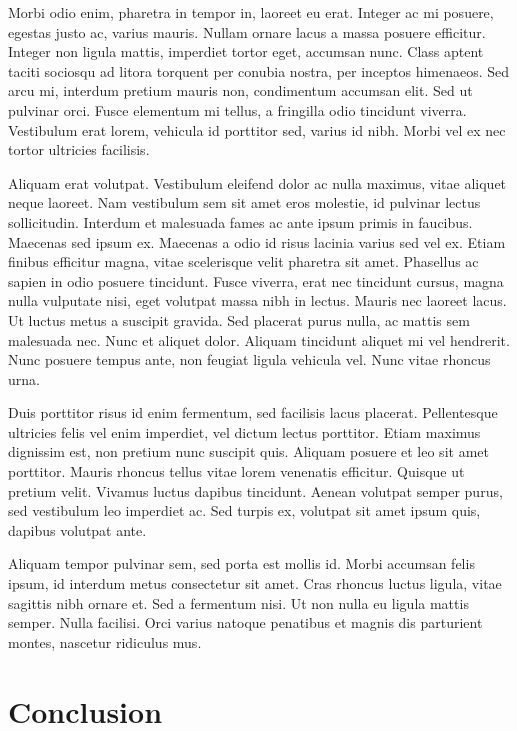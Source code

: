 \documentclass[twocolumn]{article}
\begin{document}
	Morbi odio enim, pharetra in tempor in, laoreet eu erat. Integer ac mi posuere, egestas justo ac, varius mauris. Nullam ornare lacus a massa posuere efficitur. Integer non ligula mattis, imperdiet tortor eget, accumsan nunc. Class aptent taciti sociosqu ad litora torquent per conubia nostra, per inceptos himenaeos. Sed arcu mi, interdum pretium mauris non, condimentum accumsan elit. Sed ut pulvinar orci. Fusce elementum mi tellus, a fringilla odio tincidunt viverra. Vestibulum erat lorem, vehicula id porttitor sed, varius id nibh. Morbi vel ex nec tortor ultricies facilisis.
	
	Aliquam erat volutpat. Vestibulum eleifend dolor ac nulla maximus, vitae aliquet neque laoreet. Nam vestibulum sem sit amet eros molestie, id pulvinar lectus sollicitudin. Interdum et malesuada fames ac ante ipsum primis in faucibus. Maecenas sed ipsum ex. Maecenas a odio id risus lacinia varius sed vel ex. Etiam finibus efficitur magna, vitae scelerisque velit pharetra sit amet. Phasellus ac sapien in odio posuere tincidunt. Fusce viverra, erat nec tincidunt cursus, magna nulla vulputate nisi, eget volutpat massa nibh in lectus. Mauris nec laoreet lacus. Ut luctus metus a suscipit gravida. Sed placerat purus nulla, ac mattis sem malesuada nec. Nunc et aliquet dolor. Aliquam tincidunt aliquet mi vel hendrerit. Nunc posuere tempus ante, non feugiat ligula vehicula vel. Nunc vitae rhoncus urna.
	
	Duis porttitor risus id enim fermentum, sed facilisis lacus placerat. Pellentesque ultricies felis vel enim imperdiet, vel dictum lectus porttitor. Etiam maximus dignissim est, non pretium nunc suscipit quis. Aliquam posuere et leo sit amet porttitor. Mauris rhoncus tellus vitae lorem venenatis efficitur. Quisque ut pretium velit. Vivamus luctus dapibus tincidunt. Aenean volutpat semper purus, sed vestibulum leo imperdiet ac. Sed turpis ex, volutpat sit amet ipsum quis, dapibus volutpat ante.
	
	Aliquam tempor pulvinar sem, sed porta est mollis id. Morbi accumsan felis ipsum, id interdum metus consectetur sit amet. Cras rhoncus luctus ligula, vitae sagittis nibh ornare et. Sed a fermentum nisi. Ut non nulla eu ligula mattis semper. Nulla facilisi. Orci varius natoque penatibus et magnis dis parturient montes, nascetur ridiculus mus.
	\section{Conclusion}
	
\end{document}
